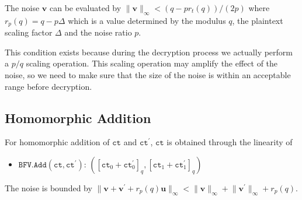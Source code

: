 \documentclass[11pt]{article}
\begin{document}
The noise $\mathbf{v}$ can be evaluated by $\lVert\mathbf{v}\rVert_\infty < (q-p r_t(q))/(2p)$ where $r_p(q)=q-p\Delta$ which is a value determined by the modulus $q$, the plaintext scaling factor $\Delta$ and the noise ratio $p$.

This condition exists because during the decryption process we actually perform a $p/q$ scaling operation. This scaling operation may amplify the effect of the noise, so we need to make sure that the size of the noise is within an acceptable range before decryption.


\subsection{Homomorphic Addition}
For homomorphic addition of $\texttt{ct}$ and $\texttt{ct}^\prime$, $\texttt{ct}$ is obtained through the linearity of
\begin{itemize}
\item $\texttt{BFV.Add}(\texttt{ct},\texttt{ct}^\prime)$: $([\texttt{ct}_0 + \texttt{ct}^\prime_0]_q, [\texttt{ct}_1 + \texttt{ct}^\prime_1]_q)$
\end{itemize}
The noise is bounded by $\lVert\mathbf{v}+\mathbf{v}^\prime +r_p(q)\mathbf{u}\rVert_\infty< \lVert\mathbf{v}\rVert_\infty+ \lVert\mathbf{v^\prime}\rVert_\infty+r_p(q)$.
\end{document}
